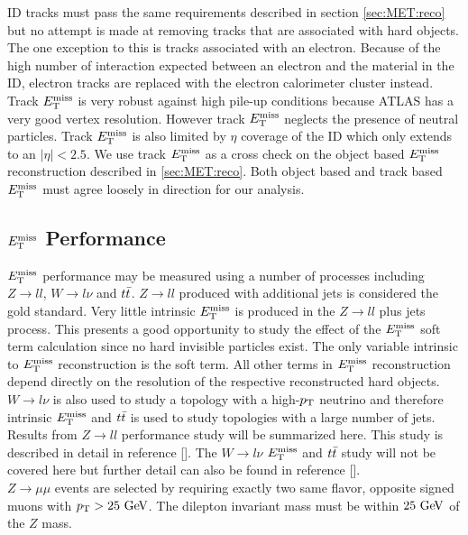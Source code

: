 \indent ID tracks must pass the same requirements described in section \ref{sec:MET:reco} but no attempt is made at removing tracks that are associated with hard objects.  The one exception to this is tracks associated with an electron.  Because of the high number of interaction expected between an electron and the material in the ID, electron tracks are replaced with the electron calorimeter cluster instead.  \\

\indent Track $E_{\mathrm{T}}^{\mathrm{miss}}$ is very robust against high pile-up conditions because ATLAS has a very good vertex resolution. However track $E_{\mathrm{T}}^{\mathrm{miss}}$ neglects the presence of neutral particles.  Track $E_{\mathrm{T}}^{\mathrm{miss}}$ is also limited by $\eta$ coverage of the ID which only extends to an $|\eta| < 2.5$.  We use track $E_{\mathrm{T}}^{\mathrm{miss}}$ as a cross check on the object based $E_{\mathrm{T}}^{\mathrm{miss}}$ reconstruction described in \ref{sec:MET:reco}. Both object based and track based $E_{\mathrm{T}}^{\mathrm{miss}}$ must agree loosely in direction for our analysis.  \\

\subsection{$E_{\mathrm{T}}^{\mathrm{miss}}$ Performance}
\label{sec:reco:METPerform}

\indent $E_{\mathrm{T}}^{\mathrm{miss}}$ performance may be measured using a number of processes including $Z\rightarrow ll$, $W\rightarrow l\nu$ and $t\bar{t}$.  $Z\rightarrow ll$ produced with additional jets is considered the gold standard.  Very little intrinsic $E_{\mathrm{T}}^{\mathrm{miss}}$ is produced in the $Z\rightarrow ll$ plus jets process.  This presents a good opportunity to study the effect of the $E_{\mathrm{T}}^{\mathrm{miss}}$ soft term calculation since no hard invisible particles exist.  The only variable intrinsic to $E_{\mathrm{T}}^{\mathrm{miss}}$ reconstruction is the soft term.  All other terms in $E_{\mathrm{T}}^{\mathrm{miss}}$ reconstruction depend directly on the resolution of the respective reconstructed hard objects.  $W\rightarrow l\nu$ is also used to study a topology with a high-$p_{\mathrm{T}}$ neutrino and therefore intrinsic $E_{\mathrm{T}}^{\mathrm{miss}}$ and $t\bar{t}$ is used to study topologies with a large number of jets. \\

\indent Results from $Z\rightarrow ll$ performance study will be summarized here.  This study is described in detail in reference [\cite{METReco}]. The $W\rightarrow l\nu$ $E_{\mathrm{T}}^{\mathrm{miss}}$ and $t\bar{t}$ study will not be covered here but further detail can also be found in reference [\cite{METReco}]. \\

\indent $Z\rightarrow \mu\mu$ events are selected by requiring exactly two same flavor, opposite signed muons with $\pt > 25 \gev$. The dilepton invariant mass must be within $25 \gev$ of the $Z$ mass. \\

